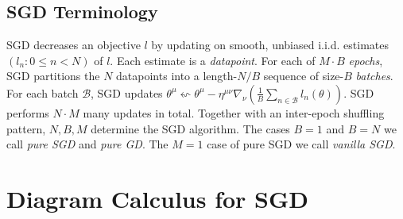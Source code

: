 \documentclass{article}
\newcommand{\Bb}{\mathcal{B}}
\newcommand{\wrap}[1]{\left(#1\right)}
\begin{document}
    \subsection{SGD Terminology}
        SGD decreases an objective $l$ by updating on smooth, unbiased i.i.d.
        estimates $(l_n: 0\leq n<N)$ of $l$.  Each estimate is a
        \emph{datapoint}.  For each of $M\cdot B$ \emph{epochs}, SGD
        partitions the $N$ datapoints into a length-$N/B$ sequence of size-$B$
        \emph{batches}.  For each batch $\Bb$, SGD updates
        $
            \theta^\mu
            \leftsquigarrow
            \theta^\mu -
            \eta^{\mu\nu} \nabla_\nu
                \wrap{\frac{1}{B} \sum_{n\in \Bb} l_n(\theta)}
        $.
        SGD performs $N\cdot M$ many updates in total.  Together with an
        inter-epoch shuffling pattern, $N, B, M$ determine the SGD algorithm.
        The cases $B=1$ and $B=N$ we call \emph{pure SGD} and \emph{pure GD}.
        The $M=1$ case of pure SGD we call \emph{vanilla SGD}.
        

\section{Diagram Calculus for SGD}

\end{document}
